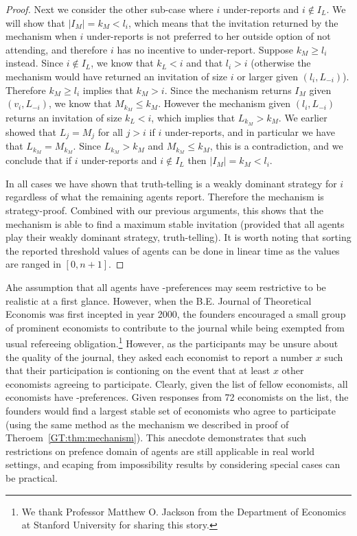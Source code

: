 \begin{proof}
	Next we consider the other sub-case where $i$ under-reports and $i\not\in I_L$. We will show that $|I_M| = k_M < l_i$, which means that the invitation returned by the mechanism when $i$ under-reports is not preferred to her outside option of not attending, and therefore $i$ has no incentive to under-report. Suppose $k_M \geq l_i$ instead. Since $i \not\in I_L$, we know that $k_L < i$ and that $l_i > i$ (otherwise the mechanism would have returned an invitation of size $i$ or larger given $(l_i, L_{-i})$). Therefore $k_M \geq l_i$ implies that $k_M > i$. Since the mechanism returns $I_M$ given $(v_i, L_{-i})$, we know that $M_{k_M} \leq k_M$. However the mechanism given $(l_i, L_{-i})$ returns an invitation of size $k_L < i$, which implies that $L_{k_M} > k_M$. We earlier showed that $L_j = M_j$ for all $j > i$ if $i$ under-reports, and in particular we have that $L_{k_M} = M_{k_M}$. Since $L_{k_M} > k_M$ and $M_{k_M} \leq k_M$, this is a contradiction, and we conclude that if $i$ under-reports and $i\not\in I_L$ then $|I_M| = k_M < l_i$. 

	In all cases we have shown that truth-telling is a weakly dominant strategy for $i$ regardless of what the remaining agents report. Therefore the mechanism is strategy-proof.  Combined with our previous arguments, this shows that the mechanism is able to find a maximum stable invitation (provided that all agents play their weakly dominant strategy, truth-telling). It is worth noting that sorting the reported threshold values of agents can be done in linear time as the values are ranged in $[0, n+1]$.
\end{proof} 	 

Ahe assumption that all agents have \INC-preferences may seem restrictive to be realistic at a first glance. However, when the B.E. Journal of Theoretical Economis was first incepted in year 2000, the founders encouraged a small group of prominent economists to contribute to the journal while being exempted from usual refereeing obligation.\footnote{We thank Professor Matthew O. Jackson from the Department of Economics at Stanford University for sharing this story.} However, as the participants may be unsure about the quality of the journal, they asked each economist to report a number $x$ such that their participation is contioning on the event that at least $x$ other economists agreeing to participate. Clearly, given the list of fellow economists, all economists have \INC-preferences. Given responses from 72 economists on the list, the founders would find a largest stable set of economists who agree to participate (using the same method as the mechanism we described in proof of Theroem~\ref{GT:thm:mechanism}). This anecdote demonstrates that such restrictions on prefence domain of agents are still applicable in real world settings, and ecaping from impossibility results by considering special cases can be practical.


